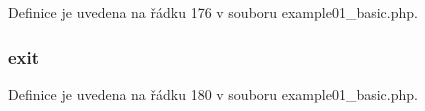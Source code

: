 Definice je uvedena na řádku 176 v souboru example01\-\_\-basic.\-php.

\hypertarget{example01__basic_8php_a6733eb5f605d09eaede9845835d71c4e}{
\subsubsection[{exit}]{\setlength{\rightskip}{0pt plus 5cm}exit}}\label{example01__basic_8php_a6733eb5f605d09eaede9845835d71c4e}


Definice je uvedena na řádku 180 v souboru example01\-\_\-basic.\-php.

